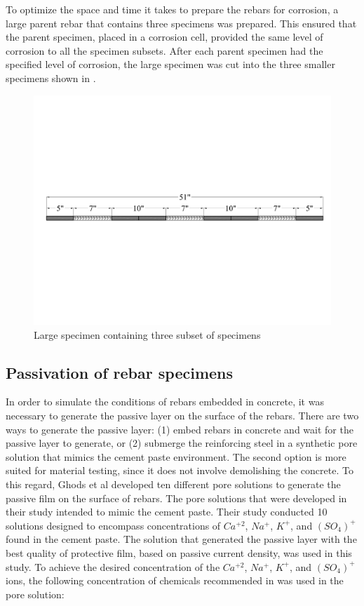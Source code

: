To optimize the space and time it takes to prepare the rebars for corrosion, a large parent rebar that contains three specimens was prepared. This ensured that the parent specimen, placed in a corrosion cell, provided the same level of corrosion to all the specimen subsets. After each parent specimen had the specified level of corrosion, the large specimen was cut into the three smaller specimens shown in .

\begin{figure}[htbp]
	\centering
	\includegraphics[width=1.0\textwidth]{Chapter-3/figs/LargeSpecimen}
	\caption{Large specimen containing three subset of specimens}
	\label{fig:LargeSpecimen}
\end{figure}

\subsection{Passivation of rebar specimens}

In order to simulate the conditions of rebars embedded in concrete, it was necessary to generate the passive layer on the surface of the rebars. There are two ways to generate the passive layer: (1) embed rebars in concrete and wait for the passive layer to generate, or (2) submerge the reinforcing steel in a synthetic pore solution that mimics the cement paste environment. The second option is more suited for material testing, since it does not involve demolishing the concrete. To this regard, Ghods et al \cite{Ghods2010} developed ten different pore solutions to generate the passive film on the surface of rebars. The pore solutions that were developed in their study intended to mimic the cement paste. Their study conducted 10 solutions designed to encompass concentrations of $Ca^{+2}$, $Na^{+}$, $K^{+}$, and $(SO_{4})^{+}$ found in the cement paste. The solution that generated the passive layer with the best quality of protective film, based on passive current density, was used in this study. To achieve the desired concentration of the $Ca^{+2}$, $Na^{+}$, $K^{+}$, and $(SO_{4})^{+}$ ions, the following concentration of chemicals recommended in \cite{Ghods2010} was used in the pore solution:

